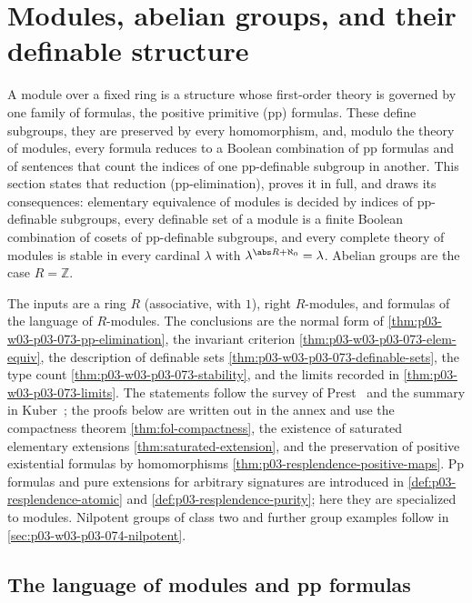 \section{Modules, abelian groups, and their definable structure}
\label{sec:p03-w03-p03-073-modules}

A module over a fixed ring is a structure whose first-order theory is
governed by one family of formulas, the positive primitive (pp) formulas.
These define subgroups, they are preserved by every homomorphism, and,
modulo the theory of modules, every formula reduces to a Boolean
combination of pp formulas and of sentences that count the indices of one
pp-definable subgroup in another. This section states that reduction
(pp-elimination), proves it in full, and draws its consequences:
elementary equivalence of modules is decided by indices of pp-definable
subgroups, every definable set of a module is a finite Boolean combination
of cosets of pp-definable subgroups, and every complete theory of modules
is stable in every cardinal \(\lambda\) with
\(\lambda^{\abs R+\aleph_0}=\lambda\). Abelian groups are the case
\(R=\mathbb Z\).

The inputs are a ring \(R\) (associative, with \(1\)), right
\(R\)-modules, and formulas of the language of \(R\)-modules. The
conclusions are the normal form of
\cref{thm:p03-w03-p03-073-pp-elimination}, the invariant criterion
\cref{thm:p03-w03-p03-073-elem-equiv}, the description of definable sets
\cref{thm:p03-w03-p03-073-definable-sets}, the type count
\cref{thm:p03-w03-p03-073-stability}, and the limits recorded in
\cref{thm:p03-w03-p03-073-limits}. The statements follow the survey of
Prest~\cite[\S\S2--7]{Prest2020ModelTheoryModules} and the summary in
Kuber~\cite[\S2.5]{Kuber2013GrothendieckModules}; the proofs below are
written out in the annex and use the compactness theorem
\cref{thm:fol-compactness}, the existence of saturated elementary
extensions \cref{thm:saturated-extension}, and the preservation of
positive existential formulas by homomorphisms
\cref{thm:p03-resplendence-positive-maps}. Pp formulas and pure
extensions for arbitrary signatures are introduced in
\cref{def:p03-resplendence-atomic} and
\cref{def:p03-resplendence-purity}; here they are specialized to modules.
Nilpotent groups of class two and further group examples follow in
\cref{sec:p03-w03-p03-074-nilpotent}.

\subsection{The language of modules and pp formulas}
\label{sec:p03-w03-p03-073-language}

